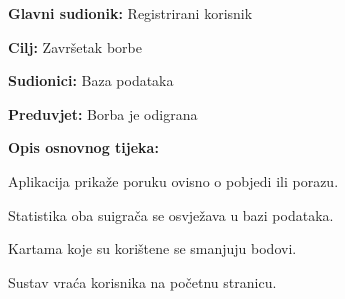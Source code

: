 \noindent {}
\begin{packed_item}
	
	\item \textbf{Glavni sudionik: }Registrirani korisnik
	\item  \textbf{Cilj:} Završetak borbe
	\item  \textbf{Sudionici:} Baza podataka
	\item  \textbf{Preduvjet:} Borba je odigrana
	\item  \textbf{Opis osnovnog tijeka:}
	
	\item[] \begin{packed_enum}
		
		\item Aplikacija prikaže poruku ovisno o pobjedi ili porazu.
		\item Statistika oba suigrača se osvježava u bazi podataka.
		\item Kartama koje su korištene se smanjuju bodovi.
		\item Sustav vraća korisnika na početnu stranicu.
	\end{packed_enum}
\end{packed_item}
	
